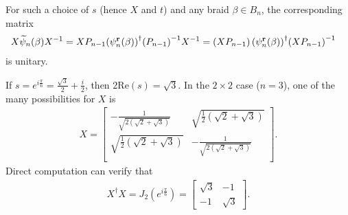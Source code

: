 For such a choice of $s$ (hence $X$ and $t$) and any braid $\beta\in B_n$, the corresponding matrix
\begin{align}
    X\widetilde{\psi}_n(\beta){ X }^{-1} &= X P_{n-1}{\left(\psi_n^\mathbf{r}(\beta)\right)}^\dagger{ \left( P_{n-1} \right) }^{-1}{ X }^{-1} = \left( X P_{n-1} \right){\left(\psi_n^\mathbf{r}(\beta)\right)}^\dagger{ \left( X P_{n-1} \right) }^{-1}
\end{align}
is unitary.

\begin{example}\label{ex:unitary}
    If $s=e^{i\frac{\pi}{6}}=\frac{\sqrt{3}}{2} + \frac{i}{2}$, then $2\textrm{Re}(s) = \sqrt{3}$. In the $2\times 2$ case ($n=3$), one of the many possibilities for $X$ is
    \begin{align}
        X = \left[
            \begin{array}{cc}
            -\frac{1}{\sqrt{2 \left(\sqrt{2}+\sqrt{3}\right)}} & \sqrt{\frac{1}{2} \left(\sqrt{2}+\sqrt{3}\right)} \\
            \sqrt{\frac{1}{2} \left(\sqrt{2}+\sqrt{3}\right)} & -\frac{1}{\sqrt{2 \left(\sqrt{2}+\sqrt{3}\right)}} \\
            \end{array}
            \right].
    \end{align}
    Direct computation can verify that
    \begin{align}
        X^\dagger X = J_{2}(e^{i\frac{\pi}{6}}) = \left[\begin{array}{cc} \sqrt{3} & -1\\ -1 & \sqrt{3} \end{array}\right].

\end{align}
\end{example}
